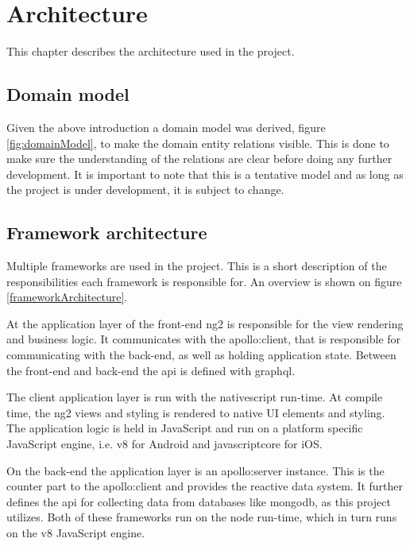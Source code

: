 \chapter{Architecture}
This chapter describes the architecture used in the project.

\section{Domain model}
Given the above introduction a domain model was derived, figure \ref{fig:domainModel}, to make the domain entity relations visible.
This is done to make sure the understanding of the relations are clear before doing any further development.
It is important to note that this is a tentative model and as long as the project is under development, it is subject to change.


\section{Framework architecture}
Multiple frameworks are used in the project. 
This is a short description of the responsibilities each framework is responsible for. 
An overview is shown on figure \ref{frameworkArchitecture}.

At the application layer of the front-end \gls{ng2} is responsible for the view rendering and business logic. 
It communicates with the \gls{apollo:client}, that is responsible for communicating with the back-end, as well as holding application state. 
Between the front-end and back-end the \gls{api} is defined with \gls{graphql}.

The client application layer is run with the \gls{nativescript} run-time. 
At compile time, the \gls{ng2} views and styling is rendered to native UI elements and styling. 
The application logic is held in JavaScript and run on a platform specific JavaScript engine, i.e. \gls{v8} for Android and \gls{javascriptcore} for iOS.

On the back-end the application layer is an \gls{apollo:server} instance. 
This is the counter part to the \gls{apollo:client} and provides the reactive data system. 
It further defines the \gls{api} for collecting data from databases like \gls{mongodb}, as this project utilizes.
Both of these frameworks run on the \gls{node} run-time, which in turn runs on the \gls{v8} JavaScript engine.



